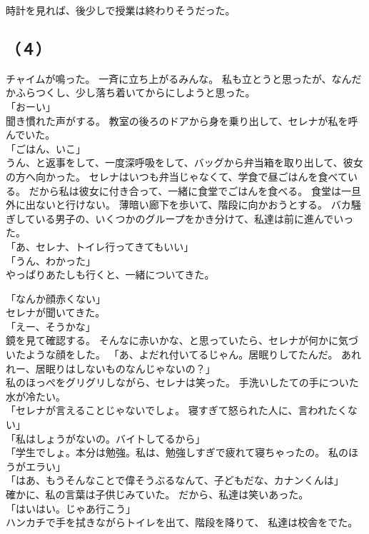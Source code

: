 \documentclass[../IHMain]{subfiles}
\begin{document}
時計を見れば、後少しで授業は終わりそうだった。

\subsection*{（４）}
チャイムが鳴った。
一斉に立ち上がるみんな。
私も立とうと思ったが、なんだかふらつくし、少し落ち着いてからにしようと思った。\\
「おーい」\\
聞き慣れた声がする。
教室の後ろのドアから身を乗り出して、セレナが私を呼んでいた。\\
「ごはん、いこ」\\
うん、と返事をして、一度深呼吸をして、バッグから弁当箱を取り出して、彼女の方へ向かった。
セレナはいつも弁当じゃなくて、学食で昼ごはんを食べている。
だから私は彼女に付き合って、一緒に食堂でごはんを食べる。
食堂は一旦外に出ないと行けない。
薄暗い廊下を歩いて、階段に向かおうとする。
バカ騒ぎしている男子の、いくつかのグループをかき分けて、私達は前に進んでいった。\\
「あ、セレナ、トイレ行ってきてもいい」\\
「うん、わかった」\\
やっぱりあたしも行くと、一緒についてきた。

「なんか顔赤くない」\\
セレナが聞いてきた。\\
「えー、そうかな」\\
鏡を見て確認する。
そんなに赤いかな、と思っていたら、セレナが何かに気づいたような顔をした。
「あ、よだれ付いてるじゃん。居眠りしてたんだ。
あれれー、居眠りはしないものなんじゃないの？」\\
私のほっぺをグリグリしながら、セレナは笑った。
手洗いしたての手についた水が冷たい。\\
「セレナが言えることじゃないでしょ。
寝すぎて怒られた人に、言われたくない」\\
「私はしょうがないの。バイトしてるから」\\
「学生でしょ。本分は勉強。私は、勉強しすぎで疲れて寝ちゃったの。
私のほうがエラい」\\
「はあ、もうそんなことで偉そうぶるなんて、子どもだな、カナンくんは」\\
確かに、私の言葉は子供じみていた。
だから、私達は笑いあった。\\
「はいはい。じゃあ行こう」\\
ハンカチで手を拭きながらトイレを出て、階段を降りて、
私達は校舎をでた。\\
\end{document}
